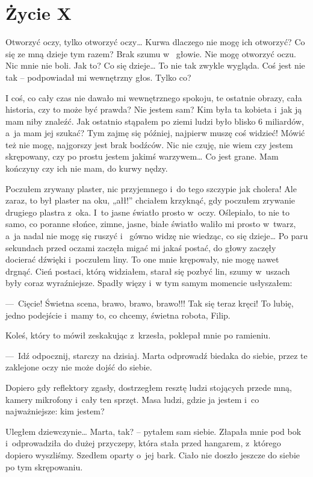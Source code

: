 \chapter{Życie X}

Otworzyć oczy, tylko otworzyć oczy… Kurwa dlaczego nie mogę ich otworzyć? Co się ze mną dzieje tym razem? Brak szumu w
~głowie. Nie mogę otworzyć oczu. Nic mnie nie boli. Jak to? Co się dzieje… To nie tak zwykle wygląda. Coś jest nie 
tak – podpowiadał mi wewnętrzny głos. Tylko co?

I coś, co cały czas nie dawało mi wewnętrznego spokoju, te ostatnie obrazy, cała historia, czy to może być prawda? 
Nie jestem sam? Kim była ta kobieta i~jak ją mam niby znaleźć. Jak ostatnio stąpałem po ziemi ludzi było blisko 6 
miliardów, a~ja mam jej szukać? Tym zajmę się później, najpierw muszę coś widzieć! Mówić też nie mogę, najgorszy jest 
brak bodźców. Nic nie czuję, nie wiem czy jestem skrępowany, czy po prostu jestem jakimś warzywem… Co jest grane. Mam 
kończyny czy ich nie mam, do kurwy nędzy.

Poczułem zrywany plaster, nic przyjemnego i~do tego szczypie jak cholera! Ale zaraz, to był plaster na oku, „ałł!” 
chciałem krzyknąć, gdy poczułem zrywanie drugiego plastra z~oka. I~to jasne światło prosto w~oczy. Oślepiało, to nie 
to samo, co poranne słońce, zimne, jasne, białe światło waliło mi prosto w~twarz, a~ja nadal nie mogę się ruszyć i~
gówno widzę nie wiedząc, co się dzieje… Po paru sekundach przed oczami zaczęła migać mi jakaś postać, do głowy 
zaczęły docierać dźwięki i~poczułem liny. To one mnie krępowały, nie mogę nawet drgnąć. Cień postaci, którą 
widziałem, starał się pozbyć lin, szumy w~uszach były coraz wyraźniejsze. Spadły więzy i~w tym samym momencie 
usłyszałem:

---~Cięcie! Świetna scena, brawo, brawo, brawo!!! Tak się teraz kręci! To lubię, jedno podejście i~mamy to, co 
chcemy, świetna robota, Filip.

Koleś, który to mówił zeskakując z~krzesła, poklepał mnie po ramieniu.  

---~Idź odpocznij, starczy na dzisiaj. Marta odprowadź biedaka do siebie, przez te zaklejone oczy nie może dojść do 
siebie.

Dopiero gdy reflektory zgasły, dostrzegłem resztę ludzi stojących przede mną, kamery mikrofony i~cały ten sprzęt. 
Masa ludzi, gdzie ja jestem i~co najważniejsze: kim jestem?

Uległem dziewczynie… Marta, tak? – pytałem sam siebie. Złapała mnie pod bok i~odprowadziła do dużej przyczepy, która 
stała przed hangarem, z~którego dopiero wyszliśmy. Szedłem oparty o~jej bark. Ciało nie doszło jeszcze do siebie po 
tym skrępowaniu.

